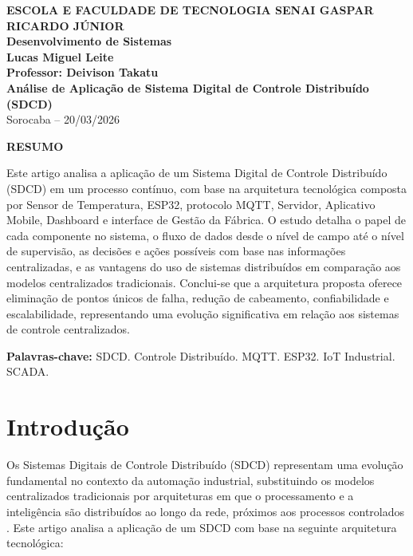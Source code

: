 \documentclass[12pt,a4paper,oneside]{article}
\begin{document}
\begin{center}
  \textbf{\large ESCOLA E FACULDADE DE TECNOLOGIA SENAI GASPAR RICARDO JÚNIOR}\\
  \textbf{Desenvolvimento de Sistemas}\\[1cm]
  \textbf{\Large Lucas Miguel Leite}\\[0.5cm]
  \textbf{Professor: Deivison Takatu}\\[2cm]
  \textbf{\LARGE\textbf{Análise de Aplicação de Sistema Digital de Controle Distribuído (SDCD)}}\\[1cm]
  Sorocaba -- 20/03/2026
\end{center}

\vspace{1cm}

\begin{center}
  \textbf{RESUMO}
\end{center}

Este artigo analisa a aplicação de um Sistema Digital de Controle Distribuído (SDCD) em um processo contínuo, com base na arquitetura tecnológica composta por Sensor de Temperatura, ESP32, protocolo MQTT, Servidor, Aplicativo Mobile, Dashboard e interface de Gestão da Fábrica. O estudo detalha o papel de cada componente no sistema, o fluxo de dados desde o nível de campo até o nível de supervisão, as decisões e ações possíveis com base nas informações centralizadas, e as vantagens do uso de sistemas distribuídos em comparação aos modelos centralizados tradicionais. Conclui-se que a arquitetura proposta oferece eliminação de pontos únicos de falha, redução de cabeamento, confiabilidade e escalabilidade, representando uma evolução significativa em relação aos sistemas de controle centralizados.

\vspace{0.5cm}
\textbf{Palavras-chave:} SDCD. Controle Distribuído. MQTT. ESP32. IoT Industrial. SCADA.

\newpage

\section{Introdução}

Os Sistemas Digitais de Controle Distribuído (SDCD) representam uma evolução fundamental no contexto da automação industrial, substituindo os modelos centralizados tradicionais por arquiteturas em que o processamento e a inteligência são distribuídos ao longo da rede, próximos aos processos controlados \cite{moraes2007}. Este artigo analisa a aplicação de um SDCD com base na seguinte arquitetura tecnológica:
\end{document}

